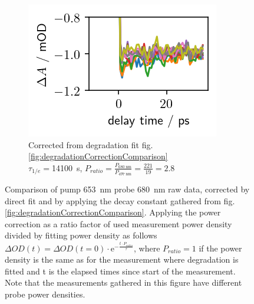 \documentclass[twoside,openright]{scrreprt}
\begin{document}
\begin{figure}[hbtp]
\begin{subfigure}[t]{0.3215\linewidth}
\includegraphics[width=\columnwidth]{images/PowerVarHigh_CorrEstimate14100_2.8.png} 
\caption{Corrected from degradation fit fig. \ref{fig:degradationCorrectionComparison}\\
$\tau_{1/e}=$\SI{14100}{\second}, $P_{ratio}=\frac{P_{\SI{680}{\nano\meter}}}{P_{\SI{497}{\nano\meter}}} = \frac{221}{19}= 2.8$}
\end{subfigure}
\caption{Comparison of pump \SI{653}{\nano\meter} probe \SI{680}{\nano\meter} raw data, corrected by direct fit and by applying the decay constant gathered from fig. \ref{fig:degradationCorrectionComparison}. Applying the power correction as a ratio factor of used measurement power density divided by fitting power density as follows $\Delta OD(t) = \Delta OD(t=0)\cdot \mathrm{e}^{-\frac{t\cdot P_{ratio}}{\tau}}$, where $P_{ratio} =1$ if the power density is the same as for the measurement where degradation is fitted and t is the elapsed times since start of the measurement. Note that the measurements gathered in this figure have different probe power densities.\label{fig:powerVarCorrection}}
\end{figure}
\end{document}
